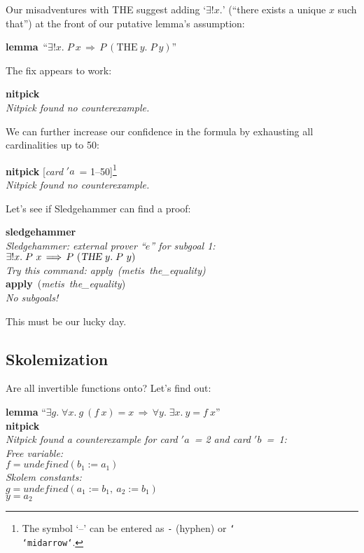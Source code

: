\documentclass[a4paper,12pt]{article}
\def\undef{\textit{undefined}}
\begin{document}
Our misadventures with THE suggest adding `$\exists!x{.}$' (``there exists a
unique $x$ such that'') at the front of our putative lemma's assumption:

\prew
\textbf{lemma}~``$\exists {!}x.\; P~x\,\Longrightarrow\, P~(\textrm{THE}~y.\;P~y)$''
\postw

The fix appears to work:

\prew
\textbf{nitpick} \\[2\smallskipamount]
\slshape Nitpick found no counterexample.
\postw

We can further increase our confidence in the formula by exhausting all
cardinalities up to 50:

\prew
\textbf{nitpick} [\textit{card} $'a$~= 1--50]\footnote{The symbol `--'
can be entered as \texttt{-} (hyphen) or
\texttt{\char`\\\char`\<midarrow\char`\>}.} \\[2\smallskipamount]
\slshape Nitpick found no counterexample.
\postw

Let's see if Sledgehammer \cite{sledgehammer-2009} can find a proof:

\prew
\textbf{sledgehammer} \\[2\smallskipamount]
{\slshape Sledgehammer: external prover ``$e$'' for subgoal 1: \\
$\exists{!}x.\; P~x\,\Longrightarrow\, P~(\hbox{\slshape THE}~y.\; P~y)$ \\
Try this command: \textrm{apply}~(\textit{metis~the\_equality})} \\[2\smallskipamount]
\textbf{apply}~(\textit{metis~the\_equality\/}) \nopagebreak \\[2\smallskipamount]
{\slshape No subgoals!}%
\postw

This must be our lucky day.

\subsection{Skolemization}
\label{skolemization}

Are all invertible functions onto? Let's find out:

\prew
\textbf{lemma} ``$\exists g.\; \forall x.~g~(f~x) = x
 \,\Longrightarrow\, \forall y.\; \exists x.~y = f~x$'' \\
\textbf{nitpick} \\[2\smallskipamount]
\slshape
Nitpick found a counterexample for \textit{card} $'a$~= 2 and \textit{card} $'b$~=~1: \\[2\smallskipamount]
\hbox{}\qquad Free variable: \nopagebreak \\
\hbox{}\qquad\qquad $f = \undef{}(b_1 := a_1)$ \\
\hbox{}\qquad Skolem constants: \nopagebreak \\
\hbox{}\qquad\qquad $g = \undef{}(a_1 := b_1,\> a_2 := b_1)$ \\
\hbox{}\qquad\qquad $y = a_2$
\postw
\end{document}
